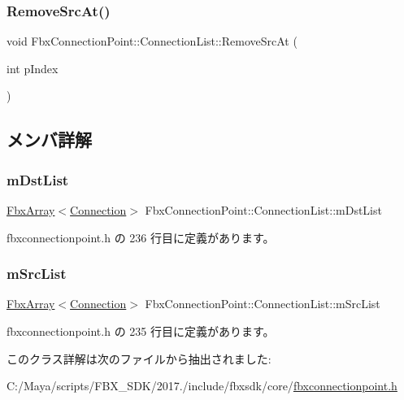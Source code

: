 \subsubsection{\texorpdfstring{Remove\+Src\+At()}{RemoveSrcAt()}}
{\footnotesize\ttfamily void Fbx\+Connection\+Point\+::\+Connection\+List\+::\+Remove\+Src\+At (\begin{DoxyParamCaption}\item[{int}]{p\+Index }\end{DoxyParamCaption})}



\subsection{メンバ詳解}
\mbox{\label{class_fbx_connection_point_1_1_connection_list_a8ac3c6f72ba91b17f651159a87670db3}} 
\subsubsection{\texorpdfstring{m\+Dst\+List}{mDstList}}
{\footnotesize\ttfamily \hyperlink{class_fbx_array}{Fbx\+Array}$<$\hyperlink{struct_fbx_connection_point_1_1_connection_list_1_1_connection}{Connection}$>$ Fbx\+Connection\+Point\+::\+Connection\+List\+::m\+Dst\+List\hspace{0.3cm}{\ttfamily [protected]}}



 fbxconnectionpoint.\+h の 236 行目に定義があります。

\mbox{\label{class_fbx_connection_point_1_1_connection_list_a9eb70c4ab758d092ca447956c37d1d20}} 
\subsubsection{\texorpdfstring{m\+Src\+List}{mSrcList}}
{\footnotesize\ttfamily \hyperlink{class_fbx_array}{Fbx\+Array}$<$\hyperlink{struct_fbx_connection_point_1_1_connection_list_1_1_connection}{Connection}$>$ Fbx\+Connection\+Point\+::\+Connection\+List\+::m\+Src\+List\hspace{0.3cm}{\ttfamily [protected]}}



 fbxconnectionpoint.\+h の 235 行目に定義があります。



このクラス詳解は次のファイルから抽出されました\+:\begin{DoxyCompactItemize}
\item 
C\+:/\+Maya/scripts/\+F\+B\+X\+\_\+\+S\+D\+K/2017./include/fbxsdk/core/\hyperlink{fbxconnectionpoint_8h}{fbxconnectionpoint.\+h}\end{DoxyCompactItemize}

